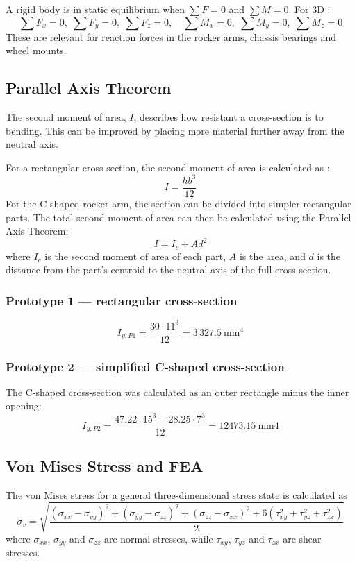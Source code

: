 A rigid body is in static equilibrium when $\sum F = 0$ and $\sum M = 0$. For 3D \cite{hibbeler_2018}:
\begin{equation}
    \sum F_x = 0,\; \sum F_y = 0,\; \sum F_z = 0, \quad 
    \sum M_x = 0,\; \sum M_y = 0,\; \sum M_z = 0
\end{equation}
These are relevant for reaction forces in the rocker arms, chassis bearings and wheel mounts.

\subsection{Parallel Axis Theorem}

The second moment of area, \(I\), describes how resistant a cross-section is to bending. This can be improved by placing more material further away from the neutral axis.

For a rectangular cross-section, the second moment of area is calculated as \cite{hibbeler_2018}:
\[
I=\frac{hb^3}{12}
\]
For the C-shaped rocker arm, the section can be divided into simpler rectangular parts. The total second moment of area can then be calculated using the Parallel Axis Theorem:
\[
I=I_c+Ad^2
\]
where \(I_c\) is the second moment of area of each part, \(A\) is the area, and \(d\) is the distance from the part's centroid to the neutral axis of the full cross-section.

\subsubsection{Prototype 1 --- rectangular cross-section}

\[
I_{y,P1}=\frac{30\cdot 11^3}{12}=3\,327.5\ \mathrm{mm}^4
\]

\subsubsection{Prototype 2 --- simplified C-shaped cross-section}

The C-shaped cross-section was calculated as an outer rectangle minus the inner opening:
\[
I_{y,P2}=\frac{47.22\cdot 15^3-28.25\cdot 7^3}{12}=12473.15\ \mathrm{mm}4
\]

\subsection{Von Mises Stress and FEA}
The von Mises stress for a general three-dimensional stress state is calculated as \cite{jong_von_mises_2009}
\[
    \sigma_v =
    \sqrt{
        \frac{
            (\sigma_{xx}-\sigma_{yy})^2
            +(\sigma_{yy}-\sigma_{zz})^2
            +(\sigma_{zz}-\sigma_{xx})^2
            +6(\tau_{xy}^2+\tau_{yz}^2+\tau_{zx}^2)
            }{2}
            }
            \]
where $\sigma_{xx}$, $\sigma_{yy}$ and $\sigma_{zz}$ are normal stresses, while $\tau_{xy}$, $\tau_{yz}$ and $\tau_{zx}$ are shear stresses.


